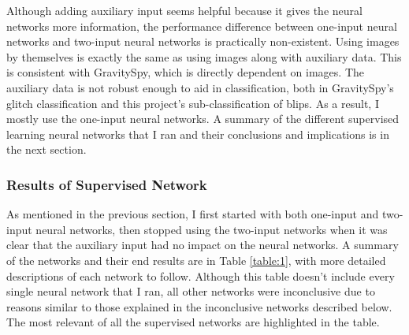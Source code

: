 \documentclass[a4paper]{article}
\begin{document}
Although adding auxiliary input seems helpful because it gives the neural networks more information, the performance difference between one-input neural networks and two-input neural networks is practically non-existent. Using images by themselves is exactly the same as using images along with auxiliary data. This is consistent with GravitySpy, which is directly dependent on images. The auxiliary data is not robust enough to aid in classification, both in GravitySpy's glitch classification and this project's sub-classification of blips. As a result, I mostly use the one-input neural networks. A summary of the different supervised learning neural networks that I ran and their conclusions and implications is in the next section.

\subsubsection{Results of Supervised Network}

As mentioned in the previous section, I first started with both one-input and two-input neural networks, then stopped using the two-input networks when it was clear that the auxiliary input had no impact on the neural networks. A summary of the networks and their end results are in Table \ref{table:1}, with more detailed descriptions of each network to follow. Although this table doesn't include every single neural network that I ran, all other networks were inconclusive due to reasons similar to those explained in the inconclusive networks described below. The most relevant of all the supervised networks are highlighted in the table.

\end{document}
